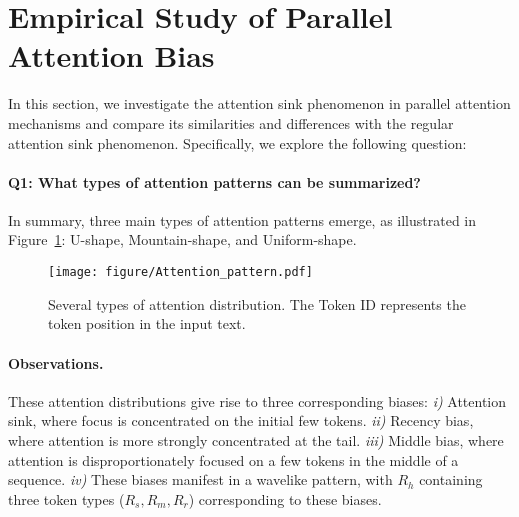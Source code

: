 \section{Empirical Study of Parallel Attention Bias}
\label{Empirical Study of Parallel Attention Bias}
In this section, we investigate the attention sink phenomenon in parallel attention mechanisms and compare its similarities and differences with the regular attention sink phenomenon. Specifically, we explore the following question:  

\vspace{-4mm}

\paragraph{Q1: What types of attention patterns can be summarized?}
 
In summary, three main types of attention patterns emerge, as illustrated in Figure~\ref{fig:attention_bias_pattern}: U-shape, Mountain-shape, and Uniform-shape. 
\begin{figure}[H]
\begin{center}
\centerline{\texttt{[image: figure/Attention\_pattern.pdf]}}
\caption{Several types of attention distribution. The Token ID represents the token position in the input text.}
\label{fig:attention_bias_pattern}
\vspace{-8mm}
\end{center}
\end{figure}

\paragraph{Observations.} These attention distributions give rise to three corresponding biases: \textit{i)} Attention sink, where focus is concentrated on the initial few tokens. \textit{ii)} Recency bias, where attention is more strongly concentrated at the tail. \textit{iii)} Middle bias, where attention is disproportionately focused on a few tokens in the middle of a sequence. \textit{iv)} These biases manifest in a wavelike pattern, with \( R_h \) containing three token types (\( R_s, R_m, R_r \)) corresponding to these biases.




